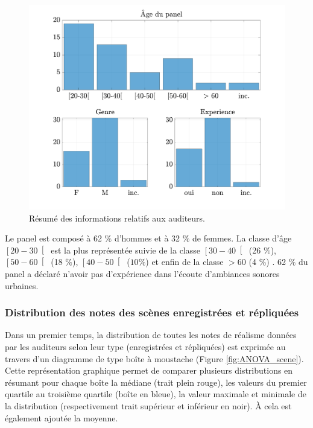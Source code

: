 \begin{figure}[ht]
\centering
\includegraphics[width = .8\textwidth]{./figures/test_perceptif/testPerceptif_panel.pdf}
\caption{Résumé des informations relatifs aux auditeurs.}
\label{fig:panelTest}
\end{figure}

Le panel est composé à 62 $\%$ d'hommes et à 32 $\%$ de femmes. La classe d'âge $\left[20-30\right[$ est la plus représentée suivie de la classe $\left[30-40\right[$ (26 $\%$), $\left[50-60\right[$ (18 $\%$), $\left[40-50\right[$ ($10\%$) et enfin de la classe $>60$ (4 $\%$) . 62 $\%$ du panel a déclaré n'avoir pas d'expérience dans l'écoute d'ambiances sonores urbaines.\\

\subsubsection{Distribution des notes des scènes enregistrées et répliquées} 

Dans un premier temps, la distribution de toutes les notes de réalisme données par les auditeurs selon leur type (enregistrées et répliquées) est exprimée au travers d'un diagramme de type \og boîte à moustache \fg{} (Figure \ref{fig:ANOVA_scene}). Cette représentation graphique permet de comparer plusieurs distributions en résumant pour chaque boîte la médiane (trait plein rouge), les valeurs du  premier quartile au troisième quartile (boîte en bleue), la valeur maximale et minimale de la distribution (respectivement trait supérieur et inférieur en noir). \`A cela est également ajoutée la moyenne.\\


